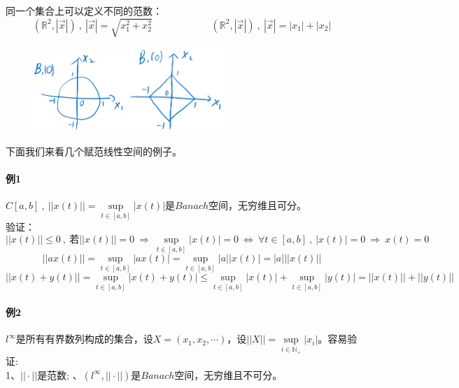 同一个集合上可以定义不同的范数：
\[(\mathbb{R}^2,|\vec{x}|) \ , \ |\vec{x}|=\sqrt{x_1^2+x_2^2} \qquad \qquad \qquad (\mathbb{R}^2,|\vec{x}|) \ , \ |\vec{x}|=|x_1|+|x_2|\]
\begin{figure}[H]
    \centering
    \begin{minipage}[t]{0.3\textwidth}
    \centering
    \includegraphics[width=3.5cm]{./fig/3.1.1-1.png}
    \end{minipage}
    \begin{minipage}[t]{0.3\textwidth}
    \centering
    \includegraphics[width=3.5cm]{./fig/3.1.1-2.png}
    \end{minipage}
\end{figure}
下面我们来看几个赋范线性空间的例子。
\paragraph*{例1}$C[a,b] \ , \ ||x(t)||=\mathop \text{sup}\limits_{t \in [a,b]}|x(t)|$是$Banach$空间，无穷维且可分。\\
验证：
\[||x(t)|| \leq 0 \ , \ \text{若}||x(t)||=0 \ \Rightarrow \ \mathop \text{sup}\limits_{t \in [a,b]}|x(t)|=0 \ \Leftrightarrow \ \forall t \in [a,b] \ , \ |x(t)|=0 \ \Rightarrow \ x(t)=0\]
\[||ax(t)||=\mathop \text{sup}\limits_{t \in [a,b]}|ax(t)|=\mathop \text{sup}\limits_{t \in [a,b]}|a||x(t)|=|a|||x(t)||\]
\[||x(t)+y(t)||=\mathop \text{sup}\limits_{t \in [a,b]}|x(t)+y(t)| \leq \mathop \text{sup}\limits_{t \in [a,b]}|x(t)|+\mathop \text{sup}\limits_{t \in [a,b]}|y(t)|=||x(t)||+||y(t)||\]

\paragraph*{例2}$l^{\infty}$是所有有界数列构成的集合，设$X=(x_1,x_2,\cdots)$，设$||X||=\mathop \text{sup}\limits_{i \in \mathbb{N}_+}|x_i|$。容易验证:\\
1、$||\cdot||$是范数; 、$(l^{\infty},||\cdot||)$是$Banach$空间，无穷维且不可分。

